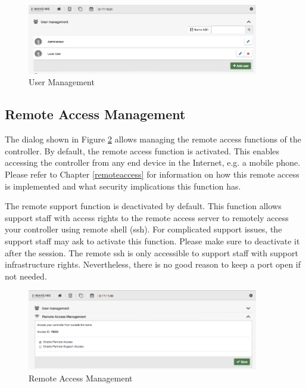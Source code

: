 \begin{figure}
\begin{center}
\includegraphics[width=0.9\textwidth]{pngs/cap4/shui71.png}
\caption{User Management}
\label{shui71}
\end{center}
\end{figure}

\subsection{Remote Access Management}


The dialog shown in Figure \ref{shui72} allows managing the remote access functions of 
the controller. By default, the remote access function is activated. This enables accessing 
the controller from any end device in the Internet, e.g. a mobile phone. Please refer 
to Chapter \ref{remoteaccess} for information on how this remote access is implemented 
and what security implications this function has.

The remote support function is deactivated by default. This function allows support 
staff with access rights to the remote access server to remotely access your controller 
using remote shell (ssh). For complicated support issues, the support staff may ask 
to activate this function. Please make sure to deactivate it after the session. The 
remote ssh is only accessible to support staff with support infrastructure rights.
 Nevertheless, there is no good reason to keep a port open if not needed.

\begin{figure}
\begin{center}
\includegraphics[width=0.9\textwidth]{pngs/cap4/shui72.png}
\caption{Remote Access Management}
\label{shui72}
\end{center}
\end{figure}

